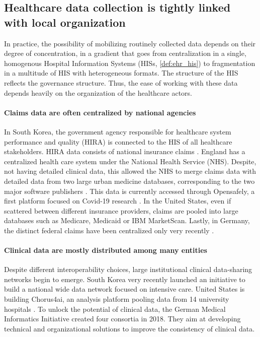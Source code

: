 \documentclass[french,12pt,twoside,a4paper]{book}
\begin{document}
\begin{background_box_left}

  \subsection{Healthcare data collection is tightly linked with local organization}%
  \label{subec:cdw:local_organization}%

  In practice, the possibility of mobilizing routinely collected data depends on
  their degree of concentration, in a gradient that goes from centralization in
  a single, homogenous Hospital Information Systems (HISs, \ref{def:ehr_his}) to
  fragmentation in a multitude of HIS with heterogeneous formats. The structure
  of the HIS reflects the governance structure. Thus, the ease of working with
  these data depends heavily on the organization of the healthcare actors.

  \paragraph{Claims data are often centralized by national agencies}

  In South Korea, the government agency responsible for healthcare system
  performance and quality (HIRA) is connected to the HIS of all healthcare
  stakeholders. HIRA data consists of national insurance claims
  \citep{kyoung2022understanding}. England has a centralized health care system
  under the National Health Service (NHS). Despite, not having detailed clinical
  data, this allowed the NHS to merge claims data with detailed data from two
  large urban medicine databases, corresponding to the two major software
  publishers \citep{opensafely_system_one_data_2023}. This data is currently
  accessed through Opensafely, a first platform focused on Covid-19 research
  \citep{opensafely_2022}. In the United States, even if scattered between
  different insurance providers, claims are pooled into large databases such as
  Medicare, Medicaid or IBM MarketScan. Lastly, in Germany, the distinct federal
  claims have been centralized only very recently \citep{kreis2016status}.

  \paragraph{Clinical data are mostly distributed among many entities}

  Despite different interoperability choices, large institutional clinical
  data-sharing networks begin to emerge. South Korea very recently launched an
  initiative to build a national wide data network focused on intensive care.
  United States is building Chorus4ai, an analysis platform pooling data from 14
  university hospitals \citep{chorus4ai_2023}. To unlock the potential of clinical
  data, the German Medical Informatics Initiative \citep{gehring_german_2018}
  created four consortia in 2018. They aim at developing technical and
  organizational solutions to improve the consistency of clinical data.


\end{background_box_left}
\end{document}
